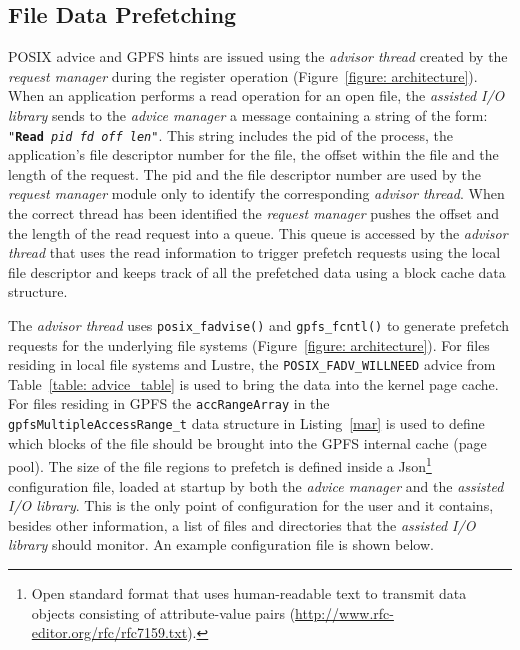\subsection{File Data Prefetching}
POSIX advice and GPFS hints are issued using the \textit{advisor thread} created by the \textit{request manager} during the register operation (Figure~\ref{figure: architecture}). When an application performs a read operation for an open file, the 
\textit{assisted I/O library} sends to the \textit{advice manager} a message containing a string of the form: \texttt{"\textbf{Read} \textit{pid} \textit{fd} \textit{off} \textit{len}"}. This string includes the pid of the process, the application's 
file descriptor number for the file, the offset within the file and the length of the request. The pid and the file descriptor number are used by the \textit{request manager} module only to identify the corresponding \textit{advisor thread}. When the 
correct thread has been identified the \textit{request manager} pushes the offset and the length of the read request into a queue. This queue is accessed by the \textit{advisor thread} that uses the read information to trigger prefetch requests using 
the local file descriptor and keeps track of all the prefetched data using a block cache data structure. %

The \textit{advisor thread} uses \texttt{posix\_fadvise()} and \texttt{gpfs\_fcntl()} to generate prefetch requests for the underlying file systems (Figure~\ref{figure: architecture}). For files residing in local file systems and Lustre, the 
\texttt{POSIX\_FADV\_WILLNEED} advice from Table~\ref{table: advice_table} is used to bring the data into the kernel page cache. For files residing in GPFS the \texttt{accRangeArray} in the \texttt{gpfsMultipleAccessRange\_t} data structure in 
Listing~\ref{mar} is used to define which blocks of the file should be brought into the GPFS internal cache (page pool). 
The size of the file regions to prefetch is defined inside a Json\footnote{Open standard format that uses human-readable text to transmit data objects consisting of attribute-value pairs (\url{http://www.rfc-editor.org/rfc/rfc7159.txt}).} configuration file, 
loaded at startup by both the \textit{advice manager} and the \textit{assisted I/O library}. This is the only point of configuration for the user and it contains, besides other information, a list of files and directories that the \textit{assisted I/O library} 
should monitor. An example configuration file is shown below. 

